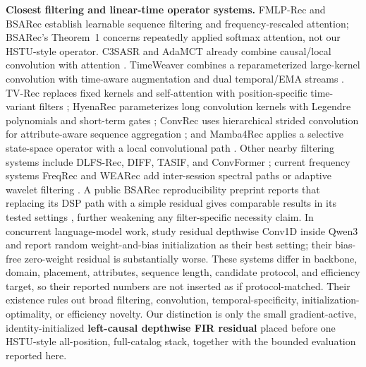 \textbf{Closest filtering and linear-time operator systems.} FMLP-Rec and BSARec establish learnable sequence filtering and frequency-rescaled attention; BSARec's Theorem~1 concerns repeatedly applied softmax attention, not our HSTU-style operator. C3SASR and AdaMCT already combine causal/local convolution with attention \citep{chen2022c3sasr,jiang2023adamct}. TimeWeaver combines a reparameterized large-kernel convolution with time-aware augmentation and dual temporal/EMA streams \citep{liu2025timeweaver}. TV-Rec replaces fixed kernels and self-attention with position-specific time-variant filters \citep{shin2025tvrec}; HyenaRec parameterizes long convolution kernels with Legendre polynomials and short-term gates \citep{liu2026hyenarec}; ConvRec uses hierarchical strided convolution for attribute-aware sequence aggregation \citep{elsayed2026convrec}; and Mamba4Rec applies a selective state-space operator with a local convolutional path \citep{liu2024mamba4rec}. Other nearby filtering systems include DLFS-Rec, DIFF, TASIF, and ConvFormer \citep{liu2023dlfsrec,kim2025diff,luo2026tasif,wang2023convformer}; current frequency systems FreqRec and WEARec add inter-session spectral paths or adaptive wavelet filtering \citep{he2026freqrec,xu2026wearec}. A public BSARec reproducibility preprint reports that replacing its DSP path with a simple residual gives comparable results in its tested settings \citep{hutter2025bsarecrepro}, further weakening any filter-specific necessity claim. In concurrent language-model work, \citet{tian2026convllm} study residual depthwise Conv1D inside Qwen3 and report random weight-and-bias initialization as their best setting; their bias-free zero-weight residual is substantially worse. These systems differ in backbone, domain, placement, attributes, sequence length, candidate protocol, and efficiency target, so their reported numbers are not inserted as if protocol-matched. Their existence rules out broad filtering, convolution, temporal-specificity, initialization-optimality, or efficiency novelty. Our distinction is only the small gradient-active, identity-initialized \textbf{left-causal depthwise FIR residual} placed before one HSTU-style all-position, full-catalog stack, together with the bounded evaluation reported here.

